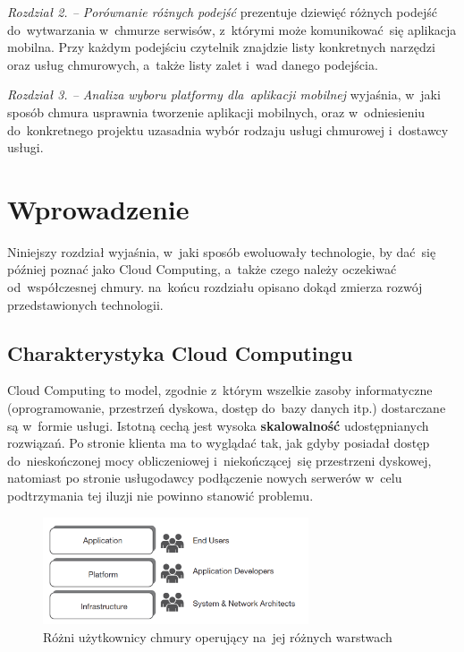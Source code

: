 \documentclass[12pt,a4paper,twoside,titlepage,openright]{book}
\begin{document}
\noindent
\textit{Rozdział 2. -- Porównanie różnych podejść} prezentuje dziewięć różnych podejść do~wytwarzania w~chmurze serwisów, z~którymi może komunikować~się aplikacja mobilna. Przy każdym podejściu czytelnik znajdzie listy konkretnych narzędzi oraz usług chmurowych, a~także listy zalet i~wad danego podejścia.

\noindent
\textit{Rozdział 3. -- Analiza wyboru platformy dla~aplikacji mobilnej} wyjaśnia, w~jaki sposób chmura usprawnia tworzenie aplikacji mobilnych, oraz w~odniesieniu do~konkretnego projektu uzasadnia wybór rodzaju usługi chmurowej i~dostawcy usługi.


\clearpage{\pagestyle{empty}\cleardoublepage}
\chapter{Wprowadzenie}

Niniejszy rozdział wyjaśnia, w~jaki sposób ewoluowały technologie, by dać~się później poznać jako Cloud Computing, a~także czego należy oczekiwać od~współczesnej chmury. na~końcu rozdziału opisano dokąd zmierza rozwój przedstawionych technologii.



\section{Charakterystyka Cloud Computingu}

Cloud Computing to model, zgodnie z~którym wszelkie zasoby informatyczne (oprogramowanie, przestrzeń dyskowa, dostęp do~bazy danych itp.) dostarczane są w~formie usługi. Istotną cechą jest wysoka \textbf{skalowalność} udostępnianych rozwiązań. Po stronie klienta ma to wyglądać tak, jak gdyby posiadał dostęp do~nieskończonej mocy obliczeniowej i~niekończącej~się przestrzeni dyskowej, natomiast po stronie usługodawcy podłączenie nowych serwerów w~celu podtrzymania tej iluzji nie powinno stanowić problemu. \cite{ccBiznes}

\begin{figure}[h]
	\centering
			\includegraphics[width=0.7\textwidth]{layers-and-users.png}
		\caption{Różni użytkownicy chmury operujący na~jej różnych warstwach \cite{ccCambridge}}
		\label{fig:layers-and-users}
\end{figure}
\end{document}
